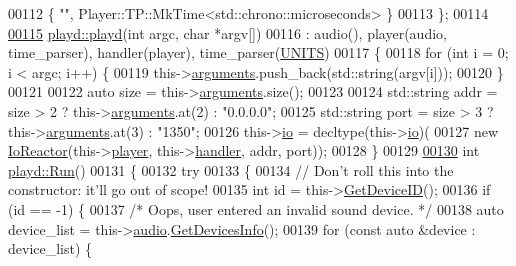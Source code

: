 \begin{DoxyCode}
00112     \{ \textcolor{stringliteral}{""}, Player::TP::MkTime<std::chrono::microseconds> \}
00113 \};
00114 
\hypertarget{main_8cpp_source_l00115}{}\hyperlink{classplayd_a2dfa519ee11ce75fbe389fcf3b15e122}{00115} \hyperlink{classplayd_a2dfa519ee11ce75fbe389fcf3b15e122}{playd::playd}(\textcolor{keywordtype}{int} argc, \textcolor{keywordtype}{char} *argv[])
00116     : audio(), player(audio, time\_parser), handler(player), time\_parser(\hyperlink{main_8cpp_a889c521ce751c2db7ba216a612c1d784}{UNITS})
00117 \{
00118     \textcolor{keywordflow}{for} (\textcolor{keywordtype}{int} i = 0; i < argc; i++) \{
00119         this->\hyperlink{classplayd_a58d45d86bd51dea16f476aae648ff63c}{arguments}.push\_back(std::string(argv[i]));
00120     \}
00121 
00122     \textcolor{keyword}{auto} size = this->\hyperlink{classplayd_a58d45d86bd51dea16f476aae648ff63c}{arguments}.size();
00123 
00124     std::string addr = size > 2 ? this->\hyperlink{classplayd_a58d45d86bd51dea16f476aae648ff63c}{arguments}.at(2) : \textcolor{stringliteral}{"0.0.0.0"};
00125     std::string port = size > 3 ? this->\hyperlink{classplayd_a58d45d86bd51dea16f476aae648ff63c}{arguments}.at(3) : \textcolor{stringliteral}{"1350"};
00126     this->\hyperlink{classplayd_a066cb450455e1359e4f80cfa5ecb5c05}{io} = decltype(this->\hyperlink{classplayd_a066cb450455e1359e4f80cfa5ecb5c05}{io})(
00127                     \textcolor{keyword}{new} \hyperlink{classIoReactor}{IoReactor}(this->\hyperlink{classplayd_a8712fc23f3139a2fd2e9dbfb24b998dd}{player}, this->\hyperlink{classplayd_a738bb18c13d3fd7db82ce000dd43d604}{handler}, addr, port));
00128 \}
00129 
\hypertarget{main_8cpp_source_l00130}{}\hyperlink{classplayd_aee84626965c812db03120ebe3267fcab}{00130} \textcolor{keywordtype}{int} \hyperlink{classplayd_aee84626965c812db03120ebe3267fcab}{playd::Run}()
00131 \{
00132     \textcolor{keywordflow}{try}
00133     \{
00134         \textcolor{comment}{// Don't roll this into the constructor: it'll go out of scope!}
00135         \textcolor{keywordtype}{int} \textcolor{keywordtype}{id} = this->\hyperlink{classplayd_a767d029a5d1321e912c1a2a92e8f3c64}{GetDeviceID}();
00136         \textcolor{keywordflow}{if} (\textcolor{keywordtype}{id} == -1) \{
00137             \textcolor{comment}{/* Oops, user entered an invalid sound device. */}
00138             \textcolor{keyword}{auto} device\_list = this->\hyperlink{classplayd_a2c7193680bd18f1e9b3f63f2234485de}{audio}.\hyperlink{classAudioSystem_aa268faeb9243c18588631024958856e6}{GetDevicesInfo}();
00139             \textcolor{keywordflow}{for} (\textcolor{keyword}{const} \textcolor{keyword}{auto} &device : device\_list) \{

\end{DoxyCode}
